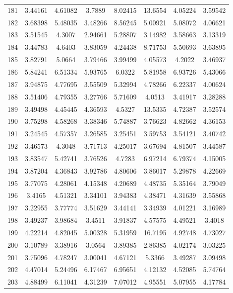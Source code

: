 \begin{center}
\begin{longtable}{cccccccc}
181 & 3.44161 & 4.61082 & 3.7889 & 8.02415 & 13.6554 & 4.05224 & 3.59542\\
182 & 3.68398 & 5.48035 & 3.48266 & 8.56245 & 5.00921 & 5.08072 & 4.06621\\
183 & 3.51545 & 4.3007 & 2.94661 & 5.28807 & 3.14982 & 3.58663 & 3.13319\\
184 & 3.44783 & 4.6403 & 3.83059 & 4.24438 & 8.71753 & 5.50693 & 3.63895\\
185 & 3.82791 & 5.0664 & 3.79466 & 3.99499 & 4.05573 & 4.2022 & 3.46937\\
186 & 5.84241 & 6.51334 & 5.93765 & 6.0322 & 5.81958 & 6.93726 & 5.43066\\
187 & 3.94875 & 4.77695 & 3.55509 & 5.32994 & 4.78266 & 6.22337 & 4.00624\\
188 & 3.51406 & 4.79355 & 3.27766 & 5.71609 & 4.0513 & 3.41917 & 3.28288\\
189 & 3.49498 & 4.45445 & 4.36593 & 4.5327 & 13.5335 & 4.72387 & 3.52574\\
190 & 3.75298 & 4.58268 & 3.38346 & 5.74887 & 3.76623 & 4.82662 & 4.36153\\
191 & 3.24545 & 4.57357 & 3.26585 & 3.25451 & 3.59753 & 3.54121 & 3.40742\\
192 & 3.46573 & 4.3048 & 3.71713 & 4.25017 & 3.67694 & 4.81507 & 3.44587\\
193 & 3.83547 & 5.42741 & 3.76526 & 4.7283 & 6.97214 & 6.79374 & 4.15005\\
194 & 3.87204 & 4.36843 & 3.92786 & 4.80606 & 3.86017 & 5.29878 & 4.22669\\
195 & 3.77075 & 4.28061 & 4.15348 & 4.20689 & 4.48735 & 5.35164 & 3.79049\\
196 & 3.4165 & 4.51321 & 3.34101 & 3.94383 & 4.38471 & 4.31639 & 3.55868\\
197 & 3.22955 & 3.77774 & 3.51629 & 3.44141 & 3.34939 & 4.01221 & 3.16989\\
198 & 3.49237 & 3.98684 & 3.4511 & 3.91837 & 4.57575 & 4.49521 & 3.4018\\
199 & 4.22214 & 4.82045 & 5.00328 & 5.31959 & 16.7195 & 4.92748 & 4.73027\\
200 & 3.10789 & 3.38916 & 3.0564 & 3.89385 & 2.86385 & 4.02174 & 3.03225\\
201 & 3.75096 & 4.78247 & 3.00041 & 4.67121 & 5.3366 & 3.49287 & 3.09498\\
202 & 4.47014 & 5.24496 & 6.17467 & 6.95651 & 4.12132 & 4.52085 & 5.74764\\
203 & 4.88499 & 6.11041 & 4.31239 & 7.07012 & 4.95551 & 5.07955 & 4.17784\\

\end{longtable}
\end{center}
